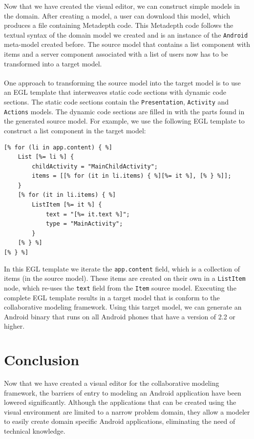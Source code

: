 Now that we have created the visual editor, we can construct simple models in the domain. After creating a model, a user can download this model, which produces a file containing Metadepth code. This Metadepth code follows the textual syntax of the domain model we created and is an instance of the \texttt{Android} meta-model created before. The source model that contains a list component with items and a server component associated with a list of users now has to be transformed into a target model. \\ \\
One approach to transforming the source model into the target model is to use an EGL template that interweaves static code sections with dynamic code sections. The static code sections contain the \texttt{Presentation}, \texttt{Activity} and \texttt{Actions} models. The dynamic code sections are filled in with the parts found in the generated source model. For example, we use the following EGL template to construct a list component in the target model:
\begin{lstlisting}[label=target-model,caption=List component in the target model, captionpos=t]
[% for (li in app.content) { %]
	List [%= li %] {
		childActivity = "MainChildActivity";
		items = [[% for (it in li.items) { %][%= it %], [% } %]];
	}
	[% for (it in li.items) { %]
		ListItem [%= it %] {
			text = "[%= it.text %]";
			type = "MainActivity";
		}
	[% } %]
[% } %]
\end{lstlisting}
In this EGL template we iterate the \texttt{app.content} field, which is a collection of items (in the source model). These items are created on their own in a \texttt{ListItem} node, which re-uses the \texttt{text} field from the \texttt{Item} source model. Executing the complete EGL template results in a target model that is conform to the collaborative modeling framework. Using this target model, we can generate an Android binary that runs on all Android phones that have a version of 2.2 or higher.

\section{Conclusion}

Now that we have created a visual editor for the collaborative modeling framework, the barriers of entry to modeling an Android application have been lowered significantly. Although the applications that can be created using the visual environment are limited to a narrow problem domain, they allow a modeler to easily create domain specific Android applications, eliminating the need of technical knowledge.
